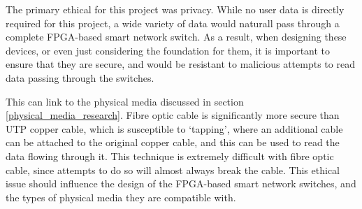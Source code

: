 
The primary ethical for this project was privacy. While no user data is directly required for this project, a wide variety of data would naturall pass through a complete FPGA-based smart network switch.
As a result, when designing these devices, or even just considering the foundation for them, it is important to ensure that they are secure, and would be resistant to malicious attempts to read data passing through the switches.

This can link to the physical media discussed in section \ref{physical_media_research}. Fibre optic cable is significantly more secure than UTP copper cable, which is susceptible to `tapping', where an additional cable can be attached to the original copper cable, and this can be used to read the data flowing through it. This technique is extremely difficult with fibre optic cable, since attempts to do so will almost always break the cable.
This ethical issue should influence the design of the FPGA-based smart network switches, and the types of physical media they are compatible with.
